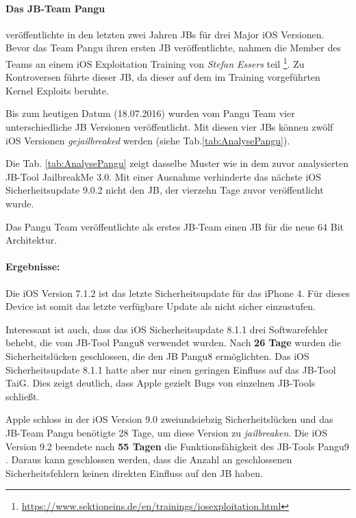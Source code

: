 \paragraph{Das JB-Team Pangu} veröffentlichte in den letzten zwei Jahren JBs für drei Major iOS Versionen. Bevor das Team Pangu ihren ersten JB veröffentlichte, nahmen die Member des Teams an einem iOS Exploitation Training von \textit{\glqq Stefan Essers\grqq{}} teil \footnote{\url{https://www.sektioneins.de/en/trainings/iosexploitation.html}}. Zu Kontroversen führte dieser JB, da dieser auf dem im Training vorgeführten Kernel Exploits beruhte.\par
Bis zum heutigen Datum (18.07.2016) wurden vom Pangu Team vier unterschiedliche JB Versionen veröffentlicht. Mit diesen vier JBs können zwölf iOS Versionen \textit{\glqq gejailbreaked\grqq{}} werden (siehe Tab.\ref{tab:AnalysePangu}).

Die Tab. \ref{tab:AnalysePangu} zeigt dasselbe Muster wie in dem zuvor analysierten JB-Tool JailbreakMe 3.0. Mit einer Ausnahme verhinderte das nächste iOS Sicherheitsupdate 9.0.2 nicht den JB, der vierzehn Tage zuvor veröffentlicht wurde. \par 
Das Pangu Team veröffentlichte als erstes JB-Team einen JB für die neue 64 Bit Architektur. 

\paragraph{Ergebnisse:}  Die iOS Version 7.1.2 ist das letzte Sicherheitsupdate für das iPhone 4. Für dieses Device ist somit das letzte verfügbare Update als nicht sicher einzustufen. \par 
Interessant ist auch, dass das iOS Sicherheitsupdate 8.1.1 drei Softwarefehler behebt, die vom JB-Tool Pangu8 verwendet wurden. Nach \textbf{26 Tage} wurden die Sicherheitslücken geschlossen, die den JB Pangu8 ermöglichten. Das iOS Sicherheitsupdate 8.1.1 hatte aber nur einen geringen Einfluss auf das JB-Tool TaiG. Dies zeigt deutlich, dass Apple gezielt Bugs von einzelnen JB-Tools schließt. 

Apple schloss in der iOS Version 9.0 zweiundsiebzig Sicherheitslücken und das JB-Team Pangu benötigte 28 Tage, um diese Version zu \textit{\glqq jailbreaken\grqq{}}. Die iOS Version 9.2 beendete nach \textbf{55 Tagen} die Funktionsfähigkeit des JB-Tools Pangu9 . Daraus kann geschlossen werden, dass die Anzahl an geschlossenen Sicherheitsfehlern keinen direkten Einfluss auf den JB haben.

